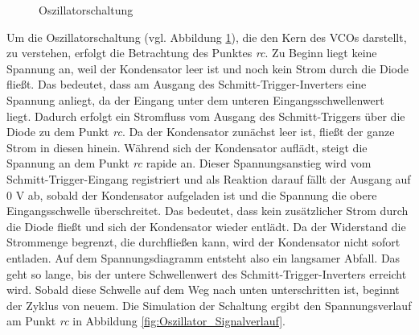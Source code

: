 \begin{figure}[h]
	\centering
	\setlength{\fboxsep}{1pt} %
	\setlength{\fboxrule}{1pt} %
	\caption{Oszillatorschaltung}
	\label{fig:Oszillatorschaltung}
\end{figure}

Um die Oszillatorschaltung (vgl. Abbildung \ref{fig:Oszillatorschaltung}), die den Kern des VCOs darstellt, zu verstehen, erfolgt die Betrachtung des Punktes \textit{rc}.
Zu Beginn liegt keine Spannung an, weil der Kondensator leer ist und noch kein Strom durch die Diode fließt. 
Das bedeutet, dass am Ausgang des Schmitt-Trigger-Inverters eine Spannung anliegt, da der Eingang unter dem unteren Eingangsschwellenwert liegt. 
Dadurch erfolgt ein Stromfluss vom Ausgang des Schmitt-Triggers über die Diode zu dem Punkt \textit{rc}. 
Da der Kondensator zunächst leer ist, fließt der ganze Strom in diesen hinein.
Während sich der Kondensator auflädt, steigt die Spannung an dem Punkt \textit{rc} rapide an.
Dieser Spannungsanstieg wird vom Schmitt-Trigger-Eingang registriert und als Reaktion darauf fällt der Ausgang auf 0 V ab, sobald der Kondensator aufgeladen ist und die Spannung die obere Eingangsschwelle überschreitet.
Das bedeutet, dass kein zusätzlicher Strom durch die Diode fließt und sich der Kondensator wieder entlädt. 
Da der Widerstand die Strommenge begrenzt, die durchfließen kann, wird der Kondensator nicht sofort entladen. 
Auf dem Spannungsdiagramm entsteht also ein langsamer Abfall. 
Das geht so lange, bis der untere Schwellenwert des Schmitt-Trigger-Inverters erreicht wird. 
Sobald diese Schwelle auf dem Weg nach unten unterschritten ist, beginnt der Zyklus von neuem.
Die Simulation der Schaltung ergibt den Spannungsverlauf am Punkt \textit{rc} in Abbildung \ref{fig:Oszillator_Signalverlauf}.

